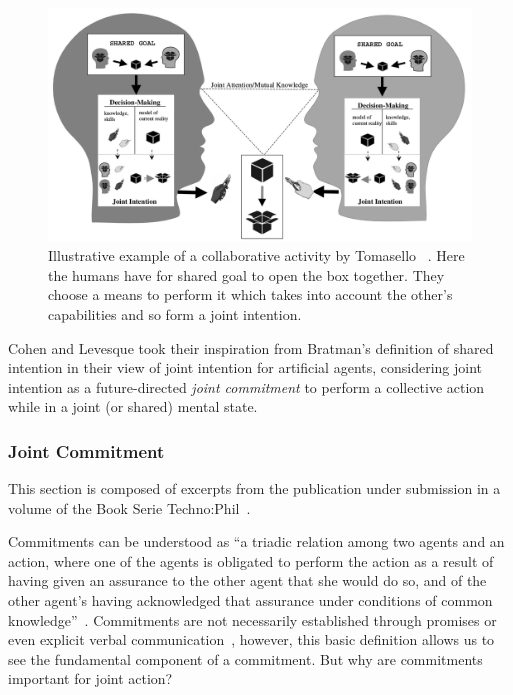 \documentclass[a4paper,11pt,twoside]{StyleThese}
\begin{document}
 \begin{figure}[!ht]
 	\includegraphics[width=\linewidth]{figures/chapter1/shared_representation.png}
 	\caption{Illustrative example of a collaborative activity by Tomasello \etal~\cite{tomasello_2005_understanding}. Here the humans have for shared goal to open the box together. They choose a means to perform it which takes into account the other's capabilities and so form a joint	intention.}
 	\label{chap1:fig:ji}
 \end{figure}

Cohen and Levesque took their inspiration from Bratman's definition of shared intention in their view of joint intention for artificial agents, considering joint intention as a future-directed \emph{joint commitment} to perform a collective action while in a joint (or shared) mental state.

\subsubsection{Joint Commitment}\label{chap1:subsubsec:joint_commit}
This section is composed of excerpts from the publication under submission in a volume of the Book Serie Techno:Phil~\cite{castro_2021_role}.

Commitments can be understood as ``a triadic relation among two agents and an action, where one of the agents is obligated to perform the action as a result of having given an assurance to the other agent that she would do so, and of the other agent’s having acknowledged that assurance under conditions of common knowledge''~\cite[p.~756]{michael_2017_commitment}. Commitments are not necessarily established through promises or even explicit verbal communication~\cite{ledyard_1994_public, scanlon_2000_we, siposova_2018_communicative}, however, this basic definition allows us to see the fundamental component of a commitment. But why are commitments important for joint action?
\end{document}
